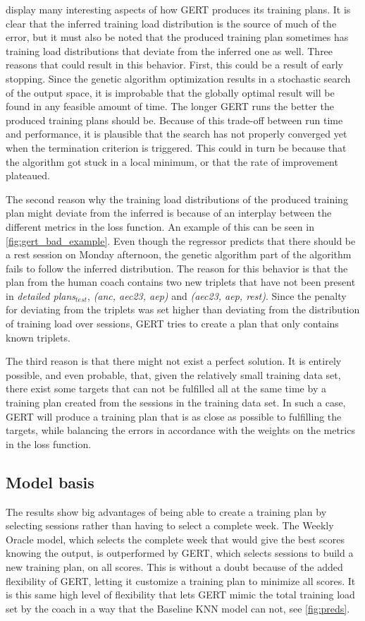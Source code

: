  display many interesting aspects of how GERT produces its training plans.
It is clear that the inferred training load distribution is the source of much of the error, but it must also be noted that the produced training plan sometimes has training load distributions that deviate from the inferred one as well.
Three reasons that could result in this behavior.
First, this could be a result of early stopping.
Since the genetic algorithm optimization results in a stochastic search of the output space, it is improbable that the globally optimal result will be found in any feasible amount of time.
The longer GERT runs the better the produced training plans should be.
Because of this trade-off between run time and performance, it is plausible that the search has not properly converged yet when the termination criterion is triggered.
This could in turn be because that the algorithm got stuck in a local minimum, or that the rate of improvement plateaued.

The second reason why the training load distributions of the produced training plan might deviate from the inferred is because of an interplay between the different metrics in the loss function.
An example of this can be seen in \cref{fig:gert_bad_example}.
Even though the regressor predicts that there should be a rest session on Monday afternoon, the genetic algorithm part of the algorithm fails to follow the inferred distribution.
The reason for this behavior is that the plan from the human coach contains two new triplets that have not been present in \textit{detailed plans}$_{test}$, \textit{(anc, aec23, aep)} and \textit{(aec23, aep, rest)}.
Since the penalty for deviating from the triplets was set higher than deviating from the distribution of training load over sessions, GERT tries to create a plan that only contains known triplets.

The third reason is that there might not exist a perfect solution.
It is entirely possible, and even probable, that, given the relatively small training data set, there exist some targets that can not be fulfilled all at the same time by a training plan created from the sessions in the training data set.
In such a case, GERT will produce a training plan that is as close as possible to fulfilling the targets, while balancing the errors in accordance with the weights on the metrics in the loss function.

\subsection{Model basis}
The results show big advantages of being able to create a training plan by selecting sessions rather than having to select a complete week.
The Weekly Oracle model, which selects the complete week that would give the best scores knowing the output, is outperformed by GERT, which selects sessions to build a new training plan, on all scores.
This is without a doubt because of the added flexibility of GERT, letting it customize a training plan to minimize all scores.
It is this same high level of flexibility that lets GERT mimic the total training load set by the coach in a way that the Baseline KNN model can not, see \cref{fig:preds}.

